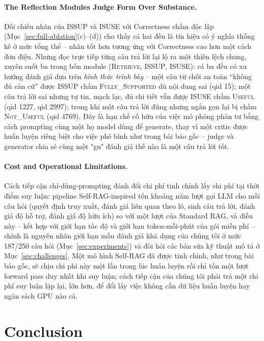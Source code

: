 \documentclass[11pt]{article}
\begin{document}
\paragraph{The Reflection Modules Judge Form Over Substance.} Đối chiếu nhãn của \textsc{ISSUP} và \textsc{ISUSE} với Correctness chấm độc lập (Mục~\ref{sec:full-ablation}(c)--(d)) cho thấy cả hai đều là tín hiệu có ý nghĩa thống kê ở mức tổng thể -- nhãn tốt hơn tương ứng với Correctness cao hơn một cách đơn điệu. Nhưng đọc trực tiếp từng câu trả lời lại lộ ra một thiên lệch chung, xuyên suốt ba trong bốn module (\textsc{Retrieve}, \textsc{ISSUP}, \textsc{ISUSE}): cả ba đều có xu hướng đánh giá dựa trên \emph{hình thức trình bày} -- một câu từ chối an toàn ``không đủ căn cứ'' được \textsc{ISSUP} chấm \textsc{Fully\_Supported} dù nội dung sai (qid 15); một câu trả lời sai nhưng tự tin, mạch lạc, đủ chi tiết vẫn được \textsc{ISUSE} chấm \textsc{Useful} (qid 1227, qid 2997); trong khi một câu trả lời đúng nhưng ngắn gọn lại bị chấm \textsc{Not\_Useful} (qid 4769). Đây là hạn chế cố hữu của việc mô phỏng phản tư bằng cách prompting cùng một họ model dùng để generate, thay vì một critic được huấn luyện riêng biệt cho việc phê bình như trong bài báo gốc -- judge và generator chia sẻ cùng một "gu" đánh giá thế nào là một câu trả lời tốt.

\paragraph{Cost and Operational Limitations.} Cách tiếp cận chỉ-dùng-prompting đánh đổi chi phí tinh chỉnh lấy chi phí tại thời điểm suy luận: pipeline Self-RAG-inspired tốn khoảng năm lượt gọi LLM cho mỗi câu hỏi (quyết định truy xuất, đánh giá liên quan theo lô, sinh câu trả lời, đánh giá độ hỗ trợ, đánh giá độ hữu ích) so với một lượt của Standard RAG, và điều này -- kết hợp với giới hạn tốc độ và giới hạn token-mỗi-phút của gói miễn phí -- chính là nguyên nhân giới hạn mẫu đánh giá khả dụng của chúng tôi ở mức 187/250 câu hỏi (Mục~\ref{sec:experiments}) và đòi hỏi các bản sửa kỹ thuật mô tả ở Mục~\ref{sec:challenges}. Một mô hình Self-RAG đã được tinh chỉnh, như trong bài báo gốc, sẽ chịu chi phí này một lần trong lúc huấn luyện rồi chỉ tốn một lượt forward pass duy nhất khi suy luận; cách tiếp cận của chúng tôi phải trả một chi phí suy luận lặp lại, lớn hơn, để đổi lấy việc không cần dữ liệu huấn luyện hay ngân sách GPU nào cả.

\section{Conclusion}
\label{sec:conclusion}
\end{document}

